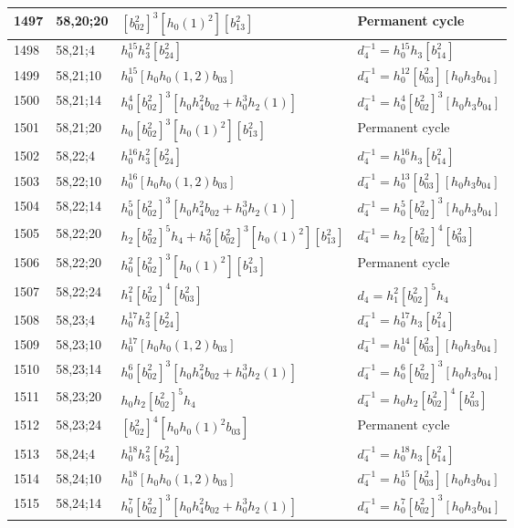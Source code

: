 \documentclass{article}
\begin{document}
\begin{longtable}{|l|l|>{\raggedright\arraybackslash}p{6cm}|>{\raggedright\arraybackslash}p{6cm}|}
\hline
1497 & 58,20;20 & $[b_{02}^2]^3[h_0(1)^2][b_{13}^2]$ & Permanent cycle\\
\hline
1498 & 58,21;4 & $h_0^{15}h_3^2[b_{24}^2]$ & $d_{4}^{-1}=h_0^{15}h_3[b_{14}^2]$\\
\hline
1499 & 58,21;10 & $h_0^{15}[h_0h_0(1, 2)b_{03}]$ & $d_{4}^{-1}=h_0^{12}[b_{03}^2][h_0h_3b_{04}]$\\
\hline
1500 & 58,21;14 & $h_0^4[b_{02}^2]^3[h_0h_4^2b_{02} + h_0^3h_2(1)]$ & $d_{4}^{-1}=h_0^4[b_{02}^2]^3[h_0h_3b_{04}]$\\
\hline
1501 & 58,21;20 & $h_0[b_{02}^2]^3[h_0(1)^2][b_{13}^2]$ & Permanent cycle\\
\hline
1502 & 58,22;4 & $h_0^{16}h_3^2[b_{24}^2]$ & $d_{4}^{-1}=h_0^{16}h_3[b_{14}^2]$\\
\hline
1503 & 58,22;10 & $h_0^{16}[h_0h_0(1, 2)b_{03}]$ & $d_{4}^{-1}=h_0^{13}[b_{03}^2][h_0h_3b_{04}]$\\
\hline
1504 & 58,22;14 & $h_0^5[b_{02}^2]^3[h_0h_4^2b_{02} + h_0^3h_2(1)]$ & $d_{4}^{-1}=h_0^5[b_{02}^2]^3[h_0h_3b_{04}]$\\
\hline
1505 & 58,22;20 & $h_2[b_{02}^2]^5h_4 + h_0^2[b_{02}^2]^3[h_0(1)^2][b_{13}^2]$ & $d_{4}^{-1}=h_2[b_{02}^2]^4[b_{03}^2]$\\
1506 & 58,22;20 & $h_0^2[b_{02}^2]^3[h_0(1)^2][b_{13}^2]$ & Permanent cycle\\
\hline
1507 & 58,22;24 & $h_1^2[b_{02}^2]^4[b_{03}^2]$ &$d_{4}=h_1^2[b_{02}^2]^5h_4$\\
\hline
1508 & 58,23;4 & $h_0^{17}h_3^2[b_{24}^2]$ & $d_{4}^{-1}=h_0^{17}h_3[b_{14}^2]$\\
\hline
1509 & 58,23;10 & $h_0^{17}[h_0h_0(1, 2)b_{03}]$ & $d_{4}^{-1}=h_0^{14}[b_{03}^2][h_0h_3b_{04}]$\\
\hline
1510 & 58,23;14 & $h_0^6[b_{02}^2]^3[h_0h_4^2b_{02} + h_0^3h_2(1)]$ & $d_{4}^{-1}=h_0^6[b_{02}^2]^3[h_0h_3b_{04}]$\\
\hline
1511 & 58,23;20 & $h_0h_2[b_{02}^2]^5h_4$ & $d_{4}^{-1}=h_0h_2[b_{02}^2]^4[b_{03}^2]$\\
\hline
1512 & 58,23;24 & $[b_{02}^2]^4[h_0h_0(1)^2b_{03}]$ & Permanent cycle\\
\hline
1513 & 58,24;4 & $h_0^{18}h_3^2[b_{24}^2]$ & $d_{4}^{-1}=h_0^{18}h_3[b_{14}^2]$\\
\hline
1514 & 58,24;10 & $h_0^{18}[h_0h_0(1, 2)b_{03}]$ & $d_{4}^{-1}=h_0^{15}[b_{03}^2][h_0h_3b_{04}]$\\
\hline
1515 & 58,24;14 & $h_0^7[b_{02}^2]^3[h_0h_4^2b_{02} + h_0^3h_2(1)]$ & $d_{4}^{-1}=h_0^7[b_{02}^2]^3[h_0h_3b_{04}]$\\

\end{longtable}
\end{document}
